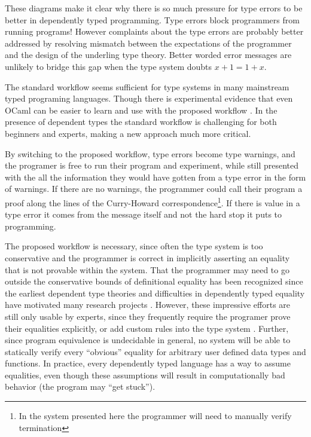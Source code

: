 These diagrams make it clear why there is so much pressure for type errors to be better in dependently typed programming\cite{eremondi2019framework}.
Type errors block programmers from running programs! However complaints about the type errors are probably better addressed by resolving mismatch between the expectations of the programmer and the design of the underling type theory.
Better worded error messages are unlikely to bridge this gap when the type system doubts $x+1=1+x$.

The standard workflow seems sufficient for type systems in many mainstream typed programing languages.
Though there is experimental evidence that even OCaml can be easier to learn and use with the proposed workflow \cite{10.1145/2951913.2951915}.
In the presence of dependent types the standard workflow is challenging for both beginners and experts, making a new approach much more critical. 


By switching to the proposed workflow, type errors become type warnings, and the programer is free to run their program and experiment, while still presented with the all the information they would have gotten from a type error in the form of warnings.
If there are no warnings, the programmer could call their program a proof along the lines of the Curry-Howard correspondence\footnote{
   In the system presented here the programmer will need to manually verify termination
}.
If there is value in a type error it comes from the message itself and not the hard stop it puts to programming.

The proposed workflow is necessary, since often the type system is too conservative and the programmer is correct in implicitly asserting an equality that is not provable within the system.
That the programmer may need to go outside the conservative bounds of definitional equality has been recognized since the earliest dependent type theories \cite{Martin-Lof-1972} and difficulties in dependently typed equality have motivated many research projects \cite{HoTTbook,sjoberg2015programming,cockx2021taming}.
However, these impressive efforts are still only usable by experts, since they frequently require the programer prove their equalities explicitly\cite{HoTTbook,sjoberg2015programming}, or add custom rules into the type system \cite{cockx2021taming}.
Further, since program equivalence is undecidable in general, no system will be able to statically verify every ``obvious'' equality for arbitrary user defined data types and functions.
In practice, every dependently typed language has a way to assume equalities, even though these assumptions will result in computationally bad behavior (the program may ``get stuck'').

